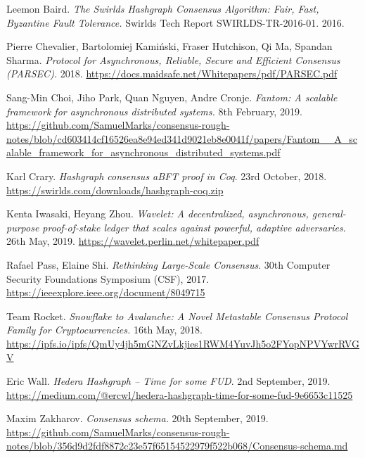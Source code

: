 \documentclass[a4paper,11pt]{article}
\begin{document}
\begin{thebibliography}{10}

   Leemon Baird. \emph{The Swirlds Hashgraph Consensus Algorithm: Fair, Fast,
    Byzantine Fault Tolerance.} Swirlds Tech Report SWIRLDS-TR-2016-01. 2016.

   Pierre Chevalier, Bartolomiej Kamiński, Fraser Hutchison, Qi Ma, Spandan
    Sharma. \emph{Protocol for Asynchronous, Reliable, Secure and Efficient Consensus (PARSEC).}
    2018. \url{https://docs.maidsafe.net/Whitepapers/pdf/PARSEC.pdf}

   Sang-Min Choi, Jiho Park, Quan Nguyen, Andre Cronje. \emph{Fantom: A scalable
    framework for asynchronous distributed systems.} 8th February, 2019.
    \url{https://github.com/SamuelMarks/consensus-rough-notes/blob/cd603414cf16526ea8e94ed341d9021eb8e0041f/papers/Fantom__A_scalable_framework_for_asynchronous_distributed_systems.pdf}

   Karl Crary. \emph{Hashgraph consensus aBFT proof in Coq}. 23rd October,
    2018. \url{https://swirlds.com/downloads/hashgraph-coq.zip}

   Kenta Iwasaki, Heyang Zhou. \emph{Wavelet: A decentralized, asynchronous,
    general-purpose proof-of-stake ledger that scales against powerful, adaptive adversaries}. 26th
    May, 2019.  \url{https://wavelet.perlin.net/whitepaper.pdf}

   Rafael Pass, Elaine Shi. \emph{Rethinking Large-Scale Consensus}. 30th
    Computer Security Foundations Symposium (CSF),
    2017. \url{https://ieeexplore.ieee.org/document/8049715}

   Team Rocket. \emph{Snowflake to Avalanche: A Novel Metastable Consensus
    Protocol Family for Cryptocurrencies.} 16th May,
    2018. \url{https://ipfs.io/ipfs/QmUy4jh5mGNZvLkjies1RWM4YuvJh5o2FYopNPVYwrRVGV}

   Eric Wall. \emph{Hedera Hashgraph -- Time for some FUD}. 2nd September,
    2019.  \url{https://medium.com/@ercwl/hedera-hashgraph-time-for-some-fud-9e6653c11525}

   Maxim Zakharov. \emph{Consensus schema.} 20th September,
    2019. \url{https://github.com/SamuelMarks/consensus-rough-notes/blob/356d9d2fdf8872c23e57f65154522979f522b068/Consensus-schema.md}

\end{thebibliography}
\end{document}
